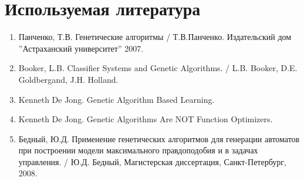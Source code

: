 \documentclass[a4paper, oneside, 11pt]{article}
\begin{document}
\section{Используемая литература}
\begin{enumerate}
\item Панченко, Т.В. Генетические алгоритмы \slash{} Т.В.Панченко. Издательский дом ''Астраханский университет'' 2007.
\item Booker, L.B. Classifier Systems and Genetic Algorithms. \slash{} L.B. Booker, D.E. Goldbergand, J.H. Holland.
\item Kenneth De Jong. Genetic Algorithm Based Learning.
\item Kenneth De Jong. Genetic Algorithms Are NOT Function Optimizers.
\item Бедный, Ю.Д. Применение генетических алгоритмов для генерации
автоматов при построении модели максимального правдоподобия и в задачах управления. \slash{} Ю.Д. Бедный, Магистерская диссертация, Санкт-Петербург, 2008.
\end{enumerate}
\end{document}

